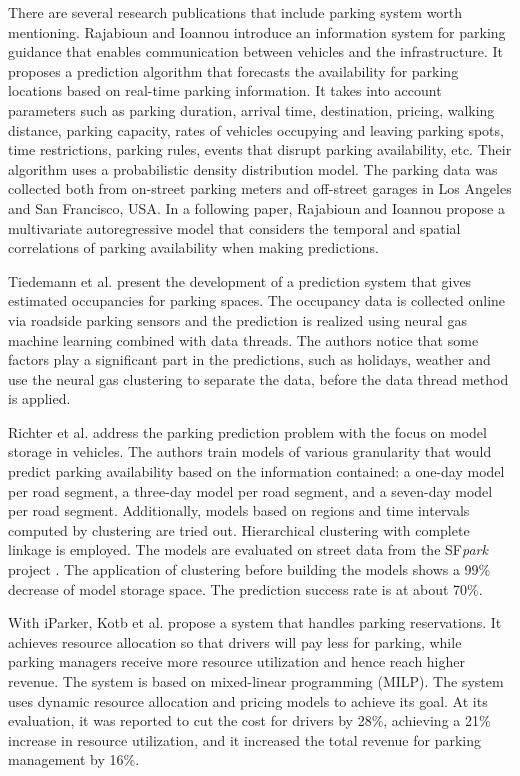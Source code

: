 	There are several research publications that include parking system worth mentioning. Rajabioun and Ioannou  introduce an information system for parking guidance that enables communication between vehicles and the infrastructure. It proposes a prediction algorithm that forecasts the availability for parking locations based on real-time parking information. It takes into account parameters such as parking duration, arrival time, destination, pricing, walking distance, parking capacity, rates of vehicles occupying and leaving parking spots, time restrictions, parking rules, events that disrupt parking availability, etc. Their algorithm uses a probabilistic density distribution model. The parking data was collected both from on-street parking meters and off-street garages in Los Angeles and San Francisco, USA. In a following paper, Rajabioun and Ioannou  propose a multivariate autoregressive model that considers the temporal and spatial correlations of parking availability when making predictions. 
	
	Tiedemann et al.  present the development of a prediction system that gives estimated occupancies for parking spaces. The occupancy data is collected online via roadside parking sensors and the prediction is realized using neural gas machine learning combined with data threads. The authors notice that some factors play a significant part in the predictions, such as holidays, weather and use the neural gas clustering to separate the data, before the data thread method is applied. 
	
	Richter et al.  address the parking prediction problem with the focus on model storage in vehicles. The authors train models of various granularity that would predict parking availability based on the information contained: a one-day model per road segment, a three-day model per road segment, and a seven-day model per road segment. Additionally, models based on regions and time intervals computed by clustering are tried out. Hierarchical clustering with complete linkage is employed. The models are evaluated on street data from the SF\textit{park} project . The application of clustering before building the models shows a 99\% decrease of model storage space. The prediction success rate is at about 70\%. 
	
	With iParker, Kotb et al.  propose a system that handles parking reservations. It achieves resource allocation so that drivers will pay less for parking, while parking managers receive more resource utilization and hence reach higher revenue. The system is based on mixed-linear programming (MILP). The system uses dynamic resource allocation and pricing models to achieve its goal. At its evaluation, it was reported to cut the cost for drivers by 28\%, achieving a 21\% increase in resource utilization, and it increased the total revenue for parking management by 16\%. 
	
